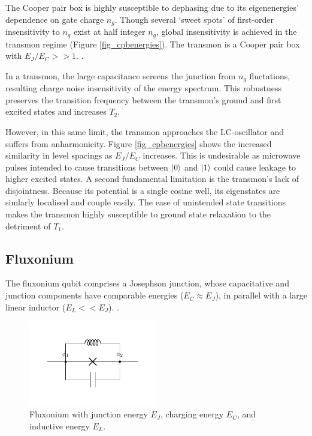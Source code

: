 \documentclass[11pt]{article}
\begin{document}
The Cooper pair box is highly susceptible to dephasing due to its eigenenergies' dependence on gate charge $n_g$. Though several `sweet spots' of first-order insensitivity to $n_g$ exist at half integer $n_g$, global insensitivity is achieved in the transmon regime (Figure \ref{fig_cpbenergies}). The transmon is a Cooper pair box with $E_J/E_C >> 1$. \cite{koch2007charge}.

In a transmon, the large capacitance screens the junction from $n_g$ fluctations, resulting charge noise insensitivity of the energy spectrum. This robustness preserves the transition frequency between the transmon's ground and first excited states and increases $T_2$.

However, in this same limit, the transmon approaches the LC-oscillator and suffers from anharmonicity. Figure \ref{fig_cpbenergies} shows the increased similarity in level spacings as $E_J/E_C$ increases. This is undesirable as microwave pulses intended to cause transitions between $\ket{0}$ and $\ket{1}$ could cause leakage to higher excited states. A second fundamental limitation is the transmon's lack of disjointness. Because its potential is a single cosine well, its eigenstates are simlarly localised and couple easily. The ease of unintended state transitions makes the transmon highly susceptible to ground state relaxation to the detriment of $T_1$.




\subsection{Fluxonium}

The fluxonium qubit comprises a Josephson junction, whose capacitative and junction components have comparable energies ($E_C \approx E_J$), in parallel with a large linear inductor ($E_L << E_J$). \cite{earnest2018realization}.

\begin{figure}[H]
	\centering
	\includegraphics[trim={0cm 1cm 0cm 1cm}, clip, width=0.5\textwidth]{fluxonium.pdf}
	\caption{Fluxonium with junction energy $E_J$, charging energy $E_C$, and inductive energy $E_L$.}
	\label{fig_fluxonium}
\end{figure}
\end{document}
